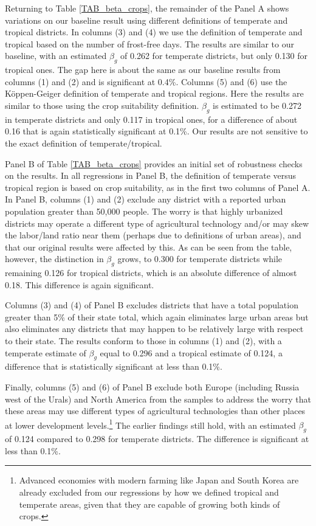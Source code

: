\documentclass[11pt]{article}
\begin{document}
Returning to Table \ref{TAB_beta_crops}, the remainder of the Panel A shows variations on our baseline result using different definitions of temperate and tropical districts. In columns (3) and (4) we use the definition of temperate and tropical based on the number of frost-free days. The results are similar to our baseline, with an estimated $\beta_g$ of 0.262 for temperate districts, but only 0.130 for tropical ones. The gap here is about the same as our baseline results from columns (1) and (2) and is significant at 0.4\%. Columns (5) and (6) use the K{\"o}ppen-Geiger definition of temperate and tropical regions. Here the results are similar to those using the crop suitability definition. $\beta_g$ is estimated to be 0.272 in temperate districts and only 0.117 in tropical ones, for a difference of about 0.16 that is again statistically significant at 0.1\%. Our results are not sensitive to the exact definition of temperate/tropical.

Panel B of Table \ref{TAB_beta_crops} provides an initial set of robustness checks on the results. In all regressions in Panel B, the definition of temperate versus tropical region is based on crop suitability, as in the first two columns of Panel A. In Panel B, columns (1) and (2) exclude any district with a reported urban population greater than 50,000 people. The worry is that highly urbanized districts may operate a different type of agricultural technology and/or may skew the labor/land ratio near them (perhaps due to definitions of urban areas), and that our original results were affected by this. As can be seen from the table, however, the distinction in $\beta_g$ grows, to 0.300 for temperate districts while remaining 0.126 for tropical districts, which is an absolute difference of almost 0.18. This difference is again significant.

Columns (3) and (4) of Panel B excludes districts that have a total population greater than 5\% of their state total, which again eliminates large urban areas but also eliminates any districts that may happen to be relatively large with respect to their state. The results conform to those in columns (1) and (2), with a temperate estimate of $\beta_g$ equal to 0.296 and a tropical estimate of 0.124, a difference that is statistically significant at less than 0.1\%.

Finally, columns (5) and (6) of Panel B exclude both Europe (including Russia west of the Urals) and North America from the samples to address the worry that these areas may use different types of agricultural technologies than other places at lower development levels.\footnote{Advanced economies with modern farming like Japan and South Korea are already excluded from our regressions by how we defined tropical and temperate areas, given that they are capable of growing both kinds of crops.} The earlier findings still hold, with an estimated $\beta_g$ of 0.124 compared to 0.298 for temperate districts. The difference is significant at less than 0.1\%.
\end{document}
